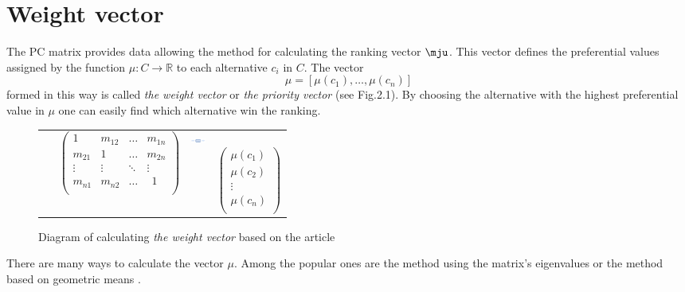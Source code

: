   \section{Weight vector}
	\label{subsec:wektorWag}
The PC matrix provides data allowing the method for calculating the ranking vector $\mju$. This vector defines the preferential values assigned by the function $\mu:C\rightarrow \mathbb{R}$ to each alternative $c_i$ in $C$. The vector $$\mu=\left[\mu\left(c_{1}\right), \ldots, \mu\left(c_{n}\right)\right]$$ formed in this way is called \textit{the weight vector} or \textit{the priority vector} (see Fig.2.1). By choosing the alternative with the highest preferential value in $\mu$ one can easily find which alternative win the ranking. 
\begin{center}
\begin{figure}[ht]
\begin{tabular}{cm{0.4\linewidth}c}
$ ~~~~~~\left(\begin{array}{cccc}
	1 & m_{12} & \dots & m_{1n}\\
	m_{21} & 1 & \dots & m_{2n}\\
	\vdots & \vdots & \ddots & \vdots\\
	m_{n1} & m_{n2} & \dots & ~~1\\ 	
\end{array}\right)$ & \includegraphics[scale=1.9]{fig3.png} & ~~~~$\left(
\begin{array}{c}
	\mu\left(c_1\right)\\
	\mu\left(c_2\right)\\	
	\vdots \\
	\mu\left(c_n\right)\\	
\end{array}
\right)$ \\
\end{tabular}
\caption{Diagram of calculating \textit{the weight vector} based on the article \cite{Kulakowski2014}}
\end{figure}
\end{center}

There are many ways to calculate the vector $\mu$. Among the popular ones are the method using the matrix's eigenvalues or the method based on geometric means \cite{SAATY1998}.

